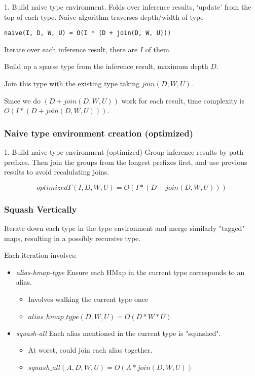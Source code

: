 1. Build naive type environment.
   Folds over inference results, `update' from the top of each type.
   Naive algorithm traverses depth/width of type 

\begin{verbatim}
naive(I, D, W, U) = O(I * (D + join(D, W, U)))
\end{verbatim}

Iterate over each inference result, there are $I$ of them.

Build up a sparse type from the inference result, maximum depth $D$.

Join this type with the existing type taking $join(D, W, U)$.

Since we do $(D + join(D, W, U))$ work for each result, time complexity
is $O(I * (D + join(D, W, U)))$.

\subsubsection{Naive type environment creation (optimized)}
\label{naive-gamma-fast}

1. Build naive type environment (optimized)
  Group inference results by path prefixes. Then join the groups
  from the longest prefixes first, and use previous results to avoid
  recalulating joins.

\[
optimized\Gamma(I, D, W, U) = O(I * (D + join(D, W, U)))
\]

\subsubsection{Squash Vertically}
\label{squash-vertically}
Iterate down each type in the type environment and merge similarly "tagged"
maps, resulting in a possibly recursive type.

Each iteration involves:

\begin{itemize}
  \item \emph{alias-hmap-type} Ensure each HMap in the current type corresponds to an alias.
		\begin{itemize}
			\item Involves walking the current type once
			\item $alias\_hmap\_type(D,W,U) = O(D*W*U)$
		\end{itemize}
  \item \emph{squash-all} Each alias mentioned in the current type is "squashed".
		\begin{itemize}
			\item At worst, could join each alias together.
			\item $squash\_all(A,D,W,U) = O(A*join(D, W, U))$
		\end{itemize}
\end{itemize}


